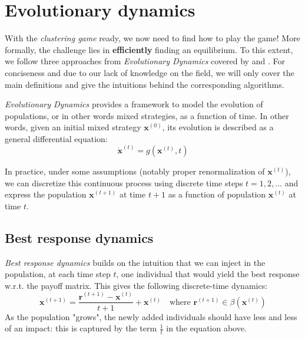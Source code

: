 \documentclass[11pt,a4paper]{article}
\begin{document}
\section{Evolutionary dynamics}
\label{sec:evo-dyn}

With the \textit{clustering game} ready, we now need to find how to play the game! More formally, the challenge lies in \textbf{efficiently} finding an equilibrium. To this extent, we follow three approaches from \textit{Evolutionary Dynamics} covered by \cite{bulo-thesis} and \cite{clustering-game}. For conciseness and due to our lack of knowledge on the field, we will only cover the main definitions and give the intuitions behind the corresponding algorithms.

\textit{Evolutionary Dynamics} provides a framework to model the evolution of populations, or in other words mixed strategies, as a function of time. In other words, given an initial mixed strategy $\mathbf{x}^{(0)}$, its evolution  is described as a general differential equation: 
\begin{equation}
    \dot{\mathbf{x}}^{(t)} = g(\mathbf{x}^{(t)}, t)
\end{equation}

In practice, under some assumptions (notably proper renormalization of $\mathbf{x}^{(t)}$), we can discretize this continuous process using discrete time steps $t=1, 2, \ldots$ and express the population $\mathbf{x}^{(t+1)}$ at time $t+1$ as a function of population $\mathbf{x}^{(t)}$ at time $t$.

\subsection*{Best response dynamics}
\textit{Best response dynamics} builds on the intuition that we can inject in the population, at each time step $t$, one individual that would yield the best response w.r.t. the payoff matrix. This gives the following discrete-time dynamics:
\begin{equation}
    \mathbf{x}^{(t+1)} = \frac{ \mathbf{r}^{(t+1)} -  \mathbf{x}^{(t)}}{t + 1} + \mathbf{x}^{(t)} \quad \text{where } \mathbf{r}^{(t+1)}\in\beta(\mathbf{x}^{(t)})
\end{equation}
As the population "grows", the newly added individuals should have less and less of an impact: this is captured by the term $\frac{1}{t}$ in the equation above.
\end{document}
